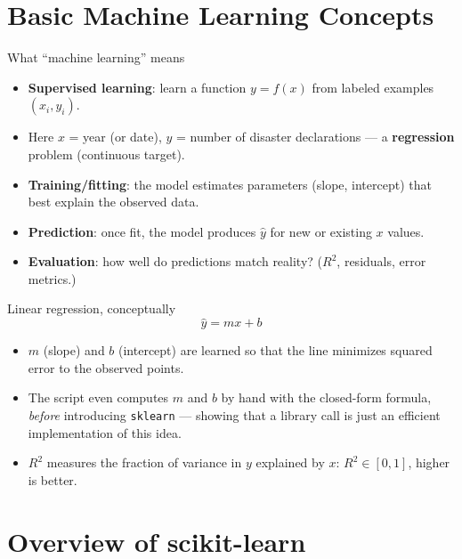 \documentclass[11pt,aspectratio=43]{beamer}
\begin{document}
\section{Basic Machine Learning Concepts}

\begin{frame}{What ``machine learning'' means}
\begin{itemize}
  \item \textbf{Supervised learning}: learn a function $y = f(x)$ from labeled examples $(x_i, y_i)$.
  \item Here $x$ = year (or date), $y$ = number of disaster declarations --- a \textbf{regression} problem (continuous target).
  \item \textbf{Training/fitting}: the model estimates parameters (slope, intercept) that best explain the observed data.
  \item \textbf{Prediction}: once fit, the model produces $\hat{y}$ for new or existing $x$ values.
  \item \textbf{Evaluation}: how well do predictions match reality? ($R^2$, residuals, error metrics.)
\end{itemize}
\end{frame}

\begin{frame}{Linear regression, conceptually}
\[
  \hat{y} = m x + b
\]
\begin{itemize}
  \item $m$ (slope) and $b$ (intercept) are learned so that the line minimizes squared error to the observed points.
  \item The script even computes $m$ and $b$ by hand with the closed-form formula, \emph{before} introducing \texttt{sklearn} --- showing that a library call is just an efficient implementation of this idea.
  \item $R^2$ measures the fraction of variance in $y$ explained by $x$: $R^2 \in [0,1]$, higher is better.
\end{itemize}
\end{frame}

\section{Overview of scikit-learn}
\end{document}
